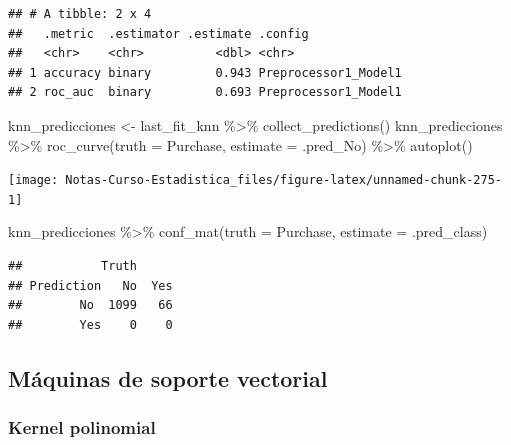 \documentclass[
  12pt,
]{book}
\newenvironment{Shaded}{\begin{snugshade}}{\end{snugshade}}
\newcommand{\AttributeTok}[1]{\textcolor[rgb]{0.77,0.63,0.00}{#1}}
\newcommand{\FunctionTok}[1]{\textcolor[rgb]{0.00,0.00,0.00}{#1}}
\newcommand{\NormalTok}[1]{#1}
\newcommand{\OtherTok}[1]{\textcolor[rgb]{0.56,0.35,0.01}{#1}}
\newcommand{\SpecialCharTok}[1]{\textcolor[rgb]{0.00,0.00,0.00}{#1}}
\begin{document}
\begin{verbatim}
## # A tibble: 2 x 4
##   .metric  .estimator .estimate .config             
##   <chr>    <chr>          <dbl> <chr>               
## 1 accuracy binary         0.943 Preprocessor1_Model1
## 2 roc_auc  binary         0.693 Preprocessor1_Model1
\end{verbatim}

\begin{Shaded}
\begin{Highlighting}[]
\NormalTok{knn\_predicciones }\OtherTok{\textless{}{-}}\NormalTok{ last\_fit\_knn }\SpecialCharTok{\%\textgreater{}\%}
    \FunctionTok{collect\_predictions}\NormalTok{()}
\NormalTok{knn\_predicciones }\SpecialCharTok{\%\textgreater{}\%}
    \FunctionTok{roc\_curve}\NormalTok{(}\AttributeTok{truth =}\NormalTok{ Purchase, }\AttributeTok{estimate =}\NormalTok{ .pred\_No) }\SpecialCharTok{\%\textgreater{}\%}
    \FunctionTok{autoplot}\NormalTok{()}
\end{Highlighting}
\end{Shaded}

\begin{center}\texttt{[image: Notas-Curso-Estadistica\_files/figure-latex/unnamed-chunk-275-1]} \end{center}

\begin{Shaded}
\begin{Highlighting}[]
\NormalTok{knn\_predicciones }\SpecialCharTok{\%\textgreater{}\%}
    \FunctionTok{conf\_mat}\NormalTok{(}\AttributeTok{truth =}\NormalTok{ Purchase, }\AttributeTok{estimate =}\NormalTok{ .pred\_class)}
\end{Highlighting}
\end{Shaded}

\begin{verbatim}
##           Truth
## Prediction   No  Yes
##        No  1099   66
##        Yes    0    0
\end{verbatim}

\hypertarget{muxe1quinas-de-soporte-vectorial}{%
\subsection{Máquinas de soporte
vectorial}\label{muxe1quinas-de-soporte-vectorial}}

\hypertarget{kernel-polinomial}{%
\subsubsection{Kernel polinomial}\label{kernel-polinomial}}
\end{document}
